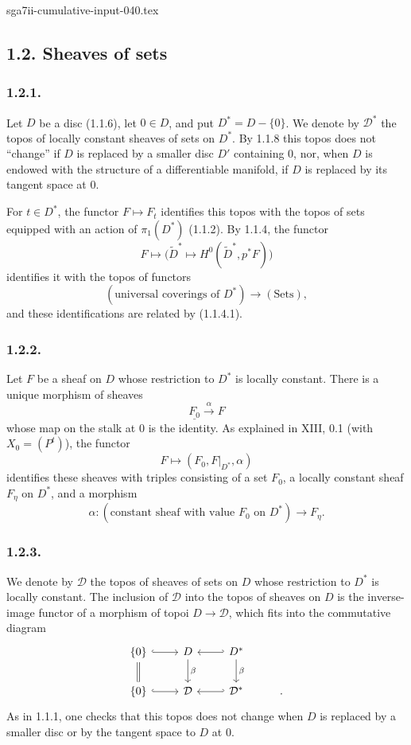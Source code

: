 \begin{filecontents*}{sga7ii-cumulative-input-040.tex}
\subsection*{1.2. Sheaves of sets}

\subsubsection*{1.2.1.}
Let $D$ be a disc (1.1.6), let $0\in D$, and put
$D^*=D-\{0\}$.  We denote by $\mathcal D^*$ the topos of locally
constant sheaves of sets on $D^*$.  By 1.1.8 this topos does not
``change'' if $D$ is replaced by a smaller disc $D'$ containing $0$,
nor, when $D$ is endowed with the structure of a differentiable
manifold, if $D$ is replaced by its tangent space at $0$.

For $t\in D^*$, the functor $F\longmapsto F_t$ identifies this topos
with the topos of sets equipped with an action of $\pi_1(D^*)$
(1.1.2).  By 1.1.4, the functor
\[
F\longmapsto
\bigl(\widetilde D^*\longmapsto
H^0(\widetilde D^*,p^*F)\bigr)
\]
identifies it with the topos of functors
\[
(\text{universal coverings of }D^*)
\longrightarrow(\mathrm{Sets}),
\]
and these identifications are related by (1.1.4.1).

\subsubsection*{1.2.2.}
Let $F$ be a sheaf on $D$ whose restriction to $D^*$ is locally
constant.  There is a unique morphism of sheaves
\[
\underline{F_0}\xrightarrow{\ \alpha\ }F
\]
whose map on the stalk at $0$ is the identity.  As explained in
XIII, 0.1 (with $X_0=(P^t)$), the functor
\[
F\longmapsto(F_0,F|_{D^*},\alpha)
\]
identifies these sheaves with triples consisting of a set $F_0$, a
locally constant sheaf $F_\eta$ on $D^*$, and a morphism
\[
\alpha:
(\text{constant sheaf with value }F_0\text{ on }D^*)
\longrightarrow F_\eta.
\]

\subsubsection*{1.2.3.}
We denote by $\mathcal D$ the topos of sheaves of sets on $D$ whose
restriction to $D^*$ is locally constant.  The inclusion of
$\mathcal D$ into the topos of sheaves on $D$ is the inverse-image
functor of a morphism of topoi $D\longrightarrow\mathcal D$, which
fits into the commutative diagram
\[
\begin{tikzcd}
\{0\} \arrow[r, hook] \arrow[d, equal]
  & D \arrow[d, "\beta"]
  & D^* \arrow[l, hook'] \arrow[d, "\beta"] & {} \\
\{0\} \arrow[r, hook]
  & \mathcal D
  & \mathcal D^* \arrow[l, hook'] & {}.
\end{tikzcd}
\]
As in 1.1.1, one checks that this topos does not change when $D$ is
replaced by a smaller disc or by the tangent space to $D$ at $0$.


\end{filecontents*}
